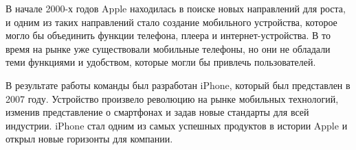 В начале 2000-х годов Apple находилась в поиске новых направлений для роста, и одним из таких направлений стало создание мобильного устройства, которое могло бы объединить функции телефона, плеера и интернет-устройства. В то время на рынке уже существовали мобильные телефоны, но они не обладали теми функциями и удобством, которые могли бы привлечь пользователей.

В результате работы команды был разработан iPhone, который был представлен в 2007 году. Устройство произвело революцию на рынке мобильных технологий, изменив представление о смартфонах и задав новые стандарты для всей индустрии. iPhone стал одним из самых успешных продуктов в истории Apple и открыл новые горизонты для компании.